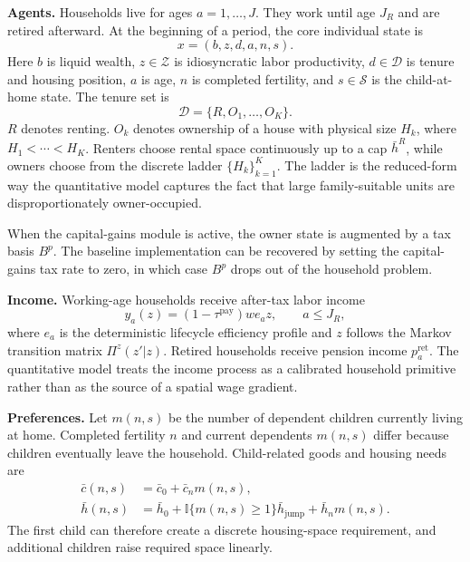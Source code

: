 \documentclass[11pt]{article}
\newcommand{\ind}{\mathbb{I}}
\newcommand{\Dset}{\mathcal D}
\newcommand{\Zset}{\mathcal Z}
\newcommand{\Sset}{\mathcal S}
\begin{document}
\textbf{Agents.}
Households live for ages $a=1,\ldots,J$. They work until age $J_R$ and are
retired afterward. At the beginning of a period, the core individual state is
\begin{equation}
    x=(b,z,d,a,n,s).
    \label{eq:state}
\end{equation}
Here $b$ is liquid wealth, $z\in\Zset$ is idiosyncratic labor productivity,
$d\in\Dset$ is tenure and housing position, $a$ is age, $n$ is completed
fertility, and $s\in\Sset$ is the child-at-home state. The tenure set is
\begin{equation*}
    \Dset=\{R,O_1,\ldots,O_K\}.
\end{equation*}
$R$ denotes renting. $O_k$ denotes ownership of a house with physical size
$H_k$, where $H_1<\cdots<H_K$. Renters choose rental space continuously up to a
cap $\bar h^R$, while owners choose from the discrete ladder $\{H_k\}_{k=1}^K$.
The ladder is the reduced-form way the quantitative model captures the fact
that large family-suitable units are disproportionately owner-occupied.

When the capital-gains module is active, the owner state is augmented by a tax
basis $B^p$. The baseline implementation can be recovered by setting the
capital-gains tax rate to zero, in which case $B^p$ drops out of the household
problem.

\textbf{Income.}
Working-age households receive after-tax labor income
\begin{equation*}
    y_a(z)=(1-\tau^{\mathrm{pay}})w e_a z,
    \qquad a\leq J_R,
\end{equation*}
where $e_a$ is the deterministic lifecycle efficiency profile and $z$ follows
the Markov transition matrix $\Pi^z(z'|z)$. Retired households receive pension
income $p^{\mathrm{ret}}_a$. The quantitative model treats the income process
as a calibrated household primitive rather than as the source of a spatial
wage gradient.

\textbf{Preferences.}
Let $m(n,s)$ be the number of dependent children currently living at home.
Completed fertility $n$ and current dependents $m(n,s)$ differ because children
eventually leave the household. Child-related goods and housing needs are
\begin{equation}
\begin{aligned}
\bar c(n,s)
    &= \bar c_0+\bar c_n m(n,s),\\
\bar h(n,s)
    &= \bar h_0
       +\ind\{m(n,s)\geq 1\}\bar h_{\mathrm{jump}}
       +\bar h_n m(n,s).
\end{aligned}
\label{eq:child_needs}
\end{equation}
The first child can therefore create a discrete housing-space requirement, and
additional children raise required space linearly.
\end{document}
